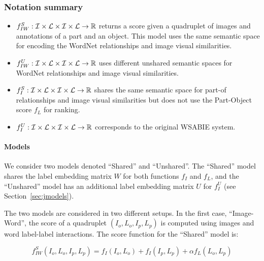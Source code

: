 \subsubsection*{Notation summary}

\begin{itemize}

\item $f_{IW}^S : {\cal I} \times {\cal L} \times {\cal I} \times {\cal L}
\rightarrow {\mathbb R}$ returns a score given a quadruplet of images and
annotations of a part and an object. This model uses the same semantic space
for encoding the WordNet relationships and image visual similarities.

\item $f_{IW}^U : {\cal I} \times {\cal L} \times {\cal I} \times {\cal L}
\rightarrow {\mathbb R}$  uses different unshared semantic spaces for
WordNet relationships and image visual similarities.
 

\item $f_{I}^S : {\cal I} \times {\cal L} \times {\cal I} \times {\cal L}
\rightarrow {\mathbb R}$  shares the same semantic space for part-of
relationships and image visual similarities but does not use the Part-Object score
$f_{L}$ for ranking.

\item $f_{I}^U : {\cal I} \times {\cal L} \times {\cal I} \times {\cal L}
\rightarrow {\mathbb R}$ corresponds to the original WSABIE system.

\end{itemize}



\paragraph{Models}

We consider two models denoted ``Shared'' and ``Unshared''. The
``Shared'' model shares the label embedding matrix $W$ for both
functions $f_I$ and $f_L$, and the ``Unshared'' model has an
additional label embedding matrix $U$ for $f_I^U$ (see
Section~\ref{sec:jmodels}). 

The two models are considered in two different setups.  In the first
case, ``Image-Word'', the score of a quadruplet $(I_o,L_o,I_p,L_p)$ is
computed using images and word label-label interactions. The score
function for the ``Shared'' model is:

\[
f_{IW}^S(I_o,L_o,I_p,L_p) = f_I(I_o,L_o) + f_I(I_p,L_p) + \alpha f_{L}(L_o,L_p) 
\]

